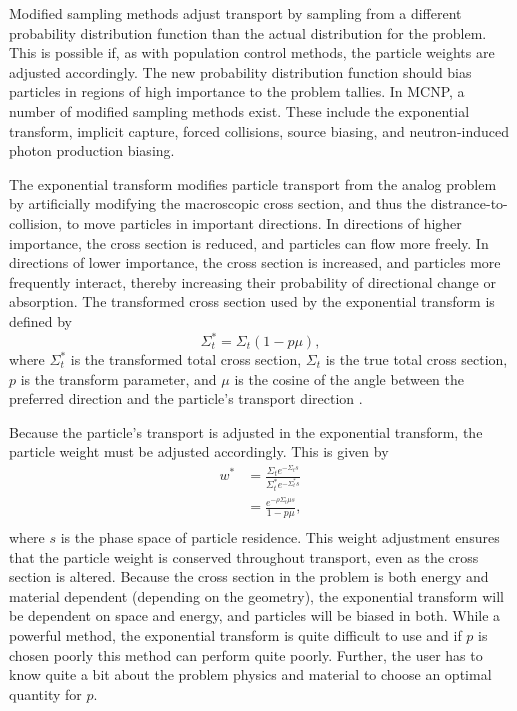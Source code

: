 Modified sampling methods adjust transport by sampling from a different probability
distribution function than the actual distribution for the problem. This is
possible if, as with population control methods, the particle weights are adjusted
 accordingly.
 The new probability distribution function should bias particles in regions of high
 importance to the problem tallies. In MCNP, a number of modified sampling
 methods exist.
 These include the exponential transform, implicit capture, forced collisions, source
 biasing, and neutron-induced photon production biasing.

The exponential transform modifies particle transport from the analog problem by
artificially modifying the macroscopic cross section, and thus the
distrance-to-collision, to move particles in important directions. In directions
of higher importance, the cross section is reduced, and particles can flow more
freely. In directions of lower importance, the cross section is increased, and
particles more frequently interact, thereby increasing their probability of
directional change or absorption. The transformed cross section used by the
exponential transform is defined by
%
\begin{equation}
  \Sigma_t^* = \Sigma_t(1-p\mu) ,
  \label{eq:ExTrns}
\end{equation}
%
where $\Sigma_t^*$ is the transformed total cross section, $\Sigma_t$ is the
true total cross section, $p$ is the transform parameter, and $\mu$ is the
cosine of the angle between the preferred direction and the particle's transport
direction \cite{mcnp_manual_v1, mcnp_manual_v2, hendricks_mcnp_1985}.

Because the particle's transport is adjusted in the exponential transform, the
particle weight must be adjusted accordingly. This is given by
%
\begin{equation*}
  \begin{split}
  w^* &= \frac{\Sigma_t e^{-\Sigma_t s}}{\Sigma_t^* e^{-\Sigma_t^* s}} \\
      &= \frac{e^{-\rho \Sigma_t \mu s}}{1-p\mu}, \\
  \end{split}
  \label{eq:ExTrnsWt}
\end{equation*}
%
where $s$ is the phase space of particle residence. This weight adjustment
ensures that the particle weight is conserved throughout transport, even as
the cross section is altered. Because the cross section in the problem is both
energy and material dependent (depending on the geometry), the exponential
transform will be dependent on space and energy, and particles will be biased in
both. While a powerful method, the exponential transform is quite difficult to
use and if $p$ is chosen poorly this method can perform quite poorly. Further,
the user has to know quite a bit about the problem physics and material to choose an
optimal quantity for $p$.

